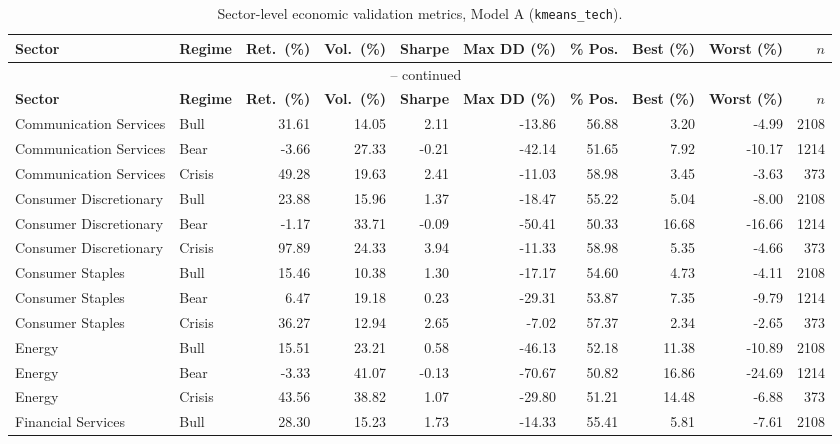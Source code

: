 \begin{landscape}
\begin{longtable}{llrrrrrrrr}
\caption{Sector-level economic validation metrics, Model A (\texttt{kmeans\_tech}).}
\label{tab:annexB-modelA}\\
\toprule
\textbf{Sector} & \textbf{Regime} & \textbf{Ret.\ (\%)} & \textbf{Vol.\ (\%)} & \textbf{Sharpe} & \textbf{Max DD (\%)} & \textbf{\% Pos.} & \textbf{Best (\%)} & \textbf{Worst (\%)} & \textbf{$n$} \\
\midrule
\endfirsthead
\multicolumn{10}{c}{\tablename\ \thetable{} -- continued} \\
\toprule
\textbf{Sector} & \textbf{Regime} & \textbf{Ret.\ (\%)} & \textbf{Vol.\ (\%)} & \textbf{Sharpe} & \textbf{Max DD (\%)} & \textbf{\% Pos.} & \textbf{Best (\%)} & \textbf{Worst (\%)} & \textbf{$n$} \\
\midrule
\endhead
\bottomrule
\endfoot
\bottomrule
\endlastfoot
Communication Services & Bull & 31.61 & 14.05 & 2.11 & -13.86 & 56.88 & 3.20 & -4.99 & 2108 \\
Communication Services & Bear & -3.66 & 27.33 & -0.21 & -42.14 & 51.65 & 7.92 & -10.17 & 1214 \\
Communication Services & Crisis & 49.28 & 19.63 & 2.41 & -11.03 & 58.98 & 3.45 & -3.63 & 373 \\
Consumer Discretionary & Bull & 23.88 & 15.96 & 1.37 & -18.47 & 55.22 & 5.04 & -8.00 & 2108 \\
Consumer Discretionary & Bear & -1.17 & 33.71 & -0.09 & -50.41 & 50.33 & 16.68 & -16.66 & 1214 \\
Consumer Discretionary & Crisis & 97.89 & 24.33 & 3.94 & -11.33 & 58.98 & 5.35 & -4.66 & 373 \\
Consumer Staples & Bull & 15.46 & 10.38 & 1.30 & -17.17 & 54.60 & 4.73 & -4.11 & 2108 \\
Consumer Staples & Bear & 6.47 & 19.18 & 0.23 & -29.31 & 53.87 & 7.35 & -9.79 & 1214 \\
Consumer Staples & Crisis & 36.27 & 12.94 & 2.65 & -7.02 & 57.37 & 2.34 & -2.65 & 373 \\
Energy & Bull & 15.51 & 23.21 & 0.58 & -46.13 & 52.18 & 11.38 & -10.89 & 2108 \\
Energy & Bear & -3.33 & 41.07 & -0.13 & -70.67 & 50.82 & 16.86 & -24.69 & 1214 \\
Energy & Crisis & 43.56 & 38.82 & 1.07 & -29.80 & 51.21 & 14.48 & -6.88 & 373 \\
Financial Services & Bull & 28.30 & 15.23 & 1.73 & -14.33 & 55.41 & 5.81 & -7.61 & 2108 \\

\end{longtable}
\end{landscape}
